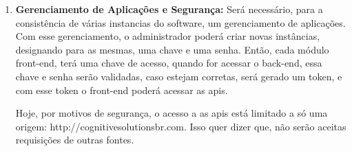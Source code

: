 
\begin{enumerate}
\item \textbf{Gerenciamento de Aplicações e Segurança:} Será necessário, para a consistência de várias instancias do software, um gerenciamento de aplicações. Com esse gerenciamento, o administrador poderá criar novas instâncias, designando para as mesmas, uma chave e uma senha. Então, cada módulo front-end, terá uma chave de acesso, quando for acessar o back-end, essa chave e senha serão validadas, caso estejam corretas, será gerado um token, e com esse token o front-end poderá acessar as apis. 
\setlength{\parindent}{10ex}
\par Hoje, por motivos de segurança, o acesso a as apis está limitado a só uma origem: http://cognitivesolutionsbr.com. Isso quer dizer que, não serão aceitas requisições de outras fontes.

\end{enumerate}
